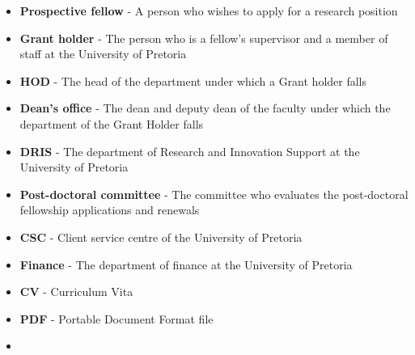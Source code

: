 \documentclass[12pt]{article}
\begin{document}
	\begin{itemize}
		\item \textbf{Prospective fellow} - A person who wishes to apply for a research position
		\item \textbf{Grant holder} - The person who is a fellow's supervisor and a member of staff at the University of Pretoria
		\item \textbf{HOD} - The head of the department under which a Grant holder falls
		\item \textbf{Dean's office} - The dean and deputy dean of the faculty under which the department of the Grant Holder falls
		\item \textbf{DRIS} - The department of Research and Innovation Support at the University of Pretoria
		\item \textbf{Post-doctoral committee} - The committee who evaluates the post-doctoral fellowship applications and renewals
		\item \textbf{CSC} - Client service centre of the University of Pretoria
		\item \textbf{Finance} - The department of finance at the University of Pretoria
		
		\item \textbf{CV} - Curriculum Vita
		\item \textbf{PDF} - Portable Document Format file
		\item    
	\end{itemize}	
		
	
	\vspace{0.5in}
		
\end{document}
